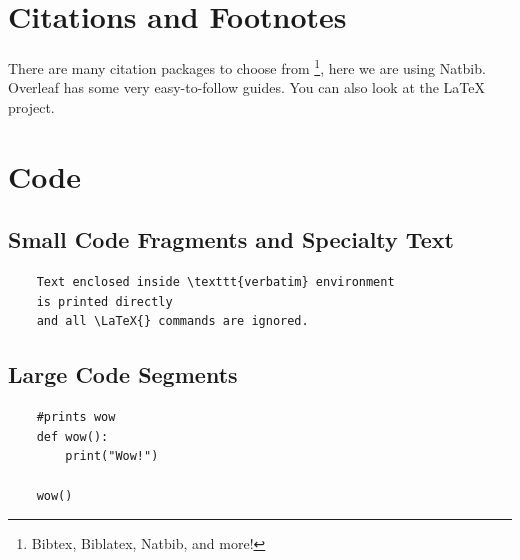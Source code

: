 \documentclass{article}
\begin{document}
\section{Citations and Footnotes}
There are many citation packages to choose from \footnote{Bibtex, Biblatex, Natbib, and more!}, here we are using Natbib. Overleaf has some very easy-to-follow guides\citep{Overleaf}. You can also look at the \LaTeX \hspace{} project\citep{LatexProj}. 


\section{Code}
    \subsection{Small Code Fragments and Specialty Text}
    \begin{verbatim}
    Text enclosed inside \texttt{verbatim} environment 
    is printed directly 
    and all \LaTeX{} commands are ignored.
    \end{verbatim}
    
    \subsection{Large Code Segments}
    \begin{verbatim}
    #prints wow
    def wow():
        print("Wow!")
    
    wow()
    \end{verbatim}
    
\end{document}
